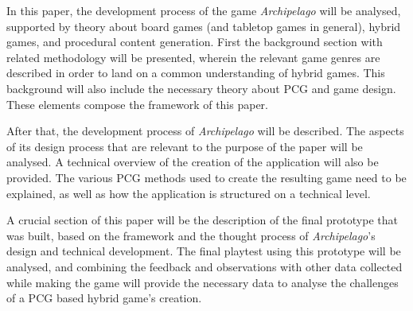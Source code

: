 
In this paper, the development process of the game \textit{Archipelago} will be analysed, supported by theory about board games (and tabletop games in general), hybrid games, and procedural content generation. First the background section with related methodology will be presented, wherein the relevant game genres are described in order to land on a common understanding of hybrid games. This background will also include the necessary theory about PCG and game design. These elements compose the framework of this paper.

After that, the development process of \textit{Archipelago} will be described. The aspects of its design process that are relevant to the purpose of the paper will be analysed. A technical overview of the creation of the application will also be provided. The various PCG methods used to create the resulting game need to be explained, as well as how the application is structured on a technical level. 

A crucial section of this paper will be the description of the final prototype that was built, based on the framework and the thought process of \textit{Archipelago}'s design and technical development. The final playtest using this prototype will be analysed, and combining the feedback and observations with other data collected while making the game will provide the necessary data to analyse the challenges of a PCG based hybrid game's creation.

